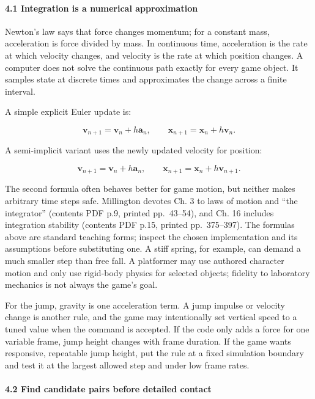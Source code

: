 \paragraph{4.1 Integration is a numerical approximation}\label{06-engine-ii-ch033-integration-is-a-numerical-approximation}

\hypertarget{06-engine-ii-ch033-integration-is-a-numerical-approximation}{}

Newton's law says that force changes momentum; for a constant mass, acceleration is force divided by mass. In continuous time, acceleration is the rate at which velocity changes, and velocity is the rate at which position changes. A computer does not solve the continuous path exactly for every game object. It samples state at discrete times and approximates the change across a finite interval.

A simple explicit Euler update is:

\[
\mathbf{v}_{n+1}=\mathbf{v}_n+h\mathbf{a}_n,
\qquad
\mathbf{x}_{n+1}=\mathbf{x}_n+h\mathbf{v}_n.
\]

A semi-implicit variant uses the newly updated velocity for position:

\[
\mathbf{v}_{n+1}=\mathbf{v}_n+h\mathbf{a}_n,
\qquad
\mathbf{x}_{n+1}=\mathbf{x}_n+h\mathbf{v}_{n+1}.
\]

The second formula often behaves better for game motion, but neither makes arbitrary time steps safe. Millington devotes Ch. 3 to laws of motion and ``the integrator'' (contents PDF p.9, printed pp.~43--54), and Ch. 16 includes integration stability (contents PDF p.15, printed pp.~375--397). The formulas above are standard teaching forms; inspect the chosen implementation and its assumptions before substituting one. A stiff spring, for example, can demand a much smaller step than free fall. A platformer may use authored character motion and only use rigid-body physics for selected objects; fidelity to laboratory mechanics is not always the game's goal.

For the jump, gravity is one acceleration term. A jump impulse or velocity change is another rule, and the game may intentionally set vertical speed to a tuned value when the command is accepted. If the code only adds a force for one variable frame, jump height changes with frame duration. If the game wants responsive, repeatable jump height, put the rule at a fixed simulation boundary and test it at the largest allowed step and under low frame rates.

\paragraph{4.2 Find candidate pairs before detailed contact}\label{06-engine-ii-ch033-find-candidate-pairs-before-detailed-contact}

